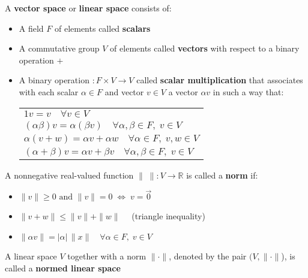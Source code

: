 \begin{definition*} A \textbf{vector space} or \textbf{linear space} consists of:
\begin{itemize}
\item A field $F$ of elements called \textbf{scalars}
\item A commutative group $V$ of elements called \textbf{vectors} with respect to a binary operation $+$
\item A binary operation $:F\times V\rightarrow V$ called \textbf{scalar multiplication} that associates 
with each scalar $\alpha\in F$ and vector $v\in V$ a vector $\alpha v$ in such a way that:
\par
\begin{tabular}{l}
$1v=v\quad \forall v\in V$\\
$(\alpha\beta)v=\alpha(\beta v)\quad\forall \alpha,\beta\in F,\;v\in V$\\
$\alpha(v+w)=\alpha v+\alpha w\quad\forall\alpha\in F,\; v,w\in V$\\
$(\alpha+\beta)v=\alpha v+\beta v\quad\forall \alpha,\beta\in F,\;v\in V$\\
\end{tabular}
\end{itemize}
\end{definition*}
\begin{definition*}[norm] A nonnegative real-valued function $\|\;\|:V\rightarrow\mathbb{R}$ is called a \textbf{norm} if:
\begin{itemize}
\item $\|v\|\geq 0\mbox{ and }\|v\|=0\;\Leftrightarrow\;v=\vec{0}$
\item $\|v+w\|\leq\|v\|+\|w\|\quad$ (triangle inequality)
\item $\|\alpha v\|=|\alpha|\,\|x\|\quad\forall\alpha\in F,\;v\in V$
\end{itemize}
\end{definition*}
\par\vspace{1 cm}
\begin{definition*} 
A linear space $V$ together with a norm $\|\cdot\|$, denoted by the pair $(V,\|\cdot\|$), is called a \textbf{normed linear space}
\end{definition*}

